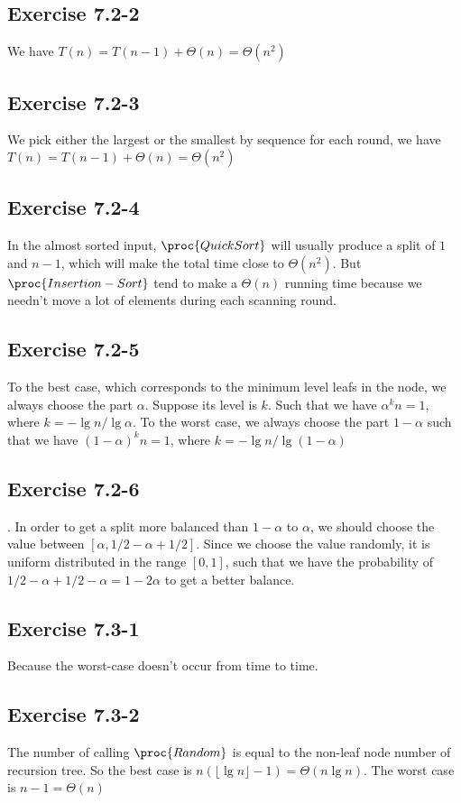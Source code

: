 \documentclass[12pt]{article}
\theoremstyle{definition}
\theoremstyle{remark}
\begin{document}
\subsection*{Exercise 7.2-2}
We have $T(n)=T(n-1)+\Theta(n)=\Theta(n^2)$
\subsection*{Exercise 7.2-3}
We pick either the largest or the smallest by sequence for each round, we have $T(n)=T(n-1)+\Theta(n)=\Theta(n^2)$
\subsection*{Exercise 7.2-4}
In the almost sorted input, $\proc{QuickSort}$ will usually produce a split of $1$ and $n-1$, which will make the total time close to $\Theta(n^2)$. But $\proc{Insertion-Sort}$ tend to make a $\Theta(n)$ running time because we needn't move a lot of elements during each scanning round.
\subsection*{Exercise 7.2-5}
To the best case, which corresponds to the minimum level leafs in the node, we always choose the part $\alpha$. Suppose its level is $k$. Such that we have $\alpha^kn=1$, where $k=-\lg{n}/\lg{\alpha}$. To the worst case, we always choose the part $1-\alpha$ such that we have $(1-\alpha)^kn=1$, where $k=-\lg{n}/\lg(1-\alpha)$
\subsection*{Exercise 7.2-6}.
In order to get a split more balanced than $1-\alpha$ to $\alpha$, we should choose the value between $[\alpha,1/2-\alpha+1/2]$. Since we choose the value randomly, it is uniform distributed in the range $[0,1]$, such that we have the probability of $1/2-\alpha+1/2-\alpha=1-2\alpha$ to get a better balance.
\subsection*{Exercise 7.3-1}
Because the worst-case doesn't occur from time to time.
\subsection*{Exercise 7.3-2}
The number of calling $\proc{Random}$ is equal to the non-leaf node number of recursion tree. So the best case is $n(\lfloor\lg{n}\rfloor-1)=\Theta(n\lg{n})$. The worst case is $n-1=\Theta(n)$
\end{document}
